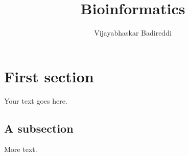 \documentclass[11pt]{article}
\title{Bioinformatics}
\author{Vijayabhaskar Badireddi}
\begin{document}

\section*{First section}

Your text goes here.

\subsection*{A subsection}

More text.
\end{document}
